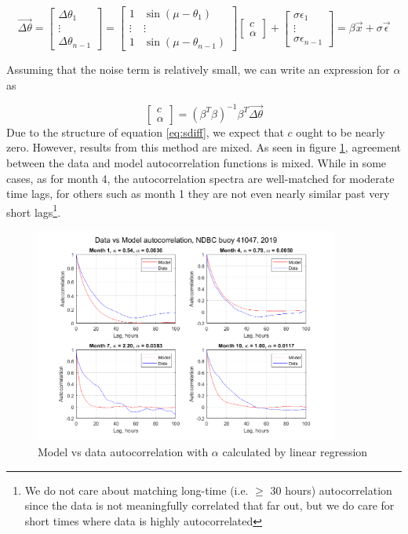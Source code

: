 \documentclass[12pt]{article}
\numberwithin{equation}{section}
\numberwithin{figure}{section}
\begin{document}
\begin{equation}\label{eq:regression}
\vec{\Delta \theta} = \begin{bmatrix} \Delta \theta_1 \\ \vdots \\ \Delta \theta_{n-1} \end{bmatrix}= 
\begin{bmatrix} 1 & \sin(\mu-\theta_1) \\ \vdots & \vdots \\  1 & \sin(\mu-\theta_{n-1})  \end{bmatrix}
\begin{bmatrix} c \\ \alpha \end{bmatrix}+
\begin{bmatrix}\sigma \epsilon_1 \\ \vdots \\ \sigma \epsilon_{n-1} \end{bmatrix}
= \beta \vec{x}+\sigma \vec{\epsilon}
\end{equation}


Assuming that the noise term is relatively small, we can write an expression for $\alpha$ as

\begin{equation}\label{eq:linreg}
\begin{bmatrix} c \\ \alpha \end{bmatrix} = (\beta^T \beta)^{-1}\beta^T \vec{\Delta \theta}
\end{equation}
Due to the structure of equation \ref{eq:sdiff}, we expect that $c$ ought to be nearly zero. However, results from this method are mixed. As seen in figure \ref{fig:linreg ac}, agreement between the data and model autocorrelation functions is mixed. While in some cases, as for month 4, the autocorrelation spectra are well-matched for moderate time lags, for others such as month 1 they are not even nearly similar past very short lags\footnote{We do not care about matching long-time (i.e. $\ge$ 30 hours) autocorrelation since the data is not meaningfully correlated that far out, but we do care for short times where data is highly autocorrelated}. 

\begin{figure}[h]
\centering
\includegraphics[width=100mm]{New Folder/data v model autocorrelation.png}
\caption{Model vs data autocorrelation with $\alpha$ calculated by linear regression}\label{fig:linreg ac}
\end{figure}
\end{document}
